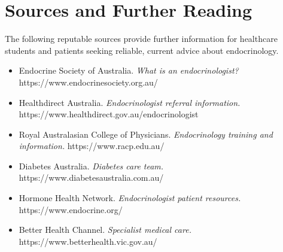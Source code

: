 \section*{Sources and Further Reading}
The following reputable sources provide further information for healthcare students and patients seeking reliable, current advice about endocrinology.
\begin{itemize}
    \item Endocrine Society of Australia. \textit{What is an endocrinologist?} https://www.endocrinesociety.org.au/
    \item Healthdirect Australia. \textit{Endocrinologist referral information.} https://www.healthdirect.gov.au/endocrinologist
    \item Royal Australasian College of Physicians. \textit{Endocrinology training and information.} https://www.racp.edu.au/
    \item Diabetes Australia. \textit{Diabetes care team.} https://www.diabetesaustralia.com.au/
    \item Hormone Health Network. \textit{Endocrinologist patient resources.} https://www.endocrine.org/
    \item Better Health Channel. \textit{Specialist medical care.} https://www.betterhealth.vic.gov.au/
\end{itemize}
